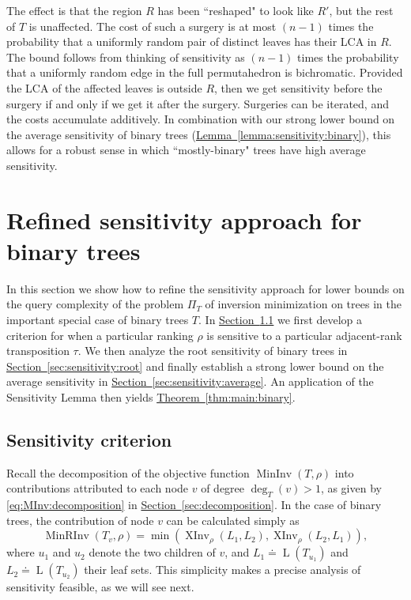 \documentclass[11pt]{article}
\numberwithin{equation}{section}
\theoremstyle{definition}
\theoremstyle{plain}
\newcommand{\expref}[2]{\hyperref[#2]{#1~\ref{#2}}}
\DeclareMathOperator{\leafset}{L}
\newcommand{\ranking}{\rho}
\newcommand{\transposition}{\tau}
\DeclareMathOperator{\XInv}{XInv}
\DeclareMathOperator{\MInv}{MinInv}
\DeclareMathOperator{\MRInv}{MinRInv}
\begin{document}
The effect is that the region $R$ has been ``reshaped" to look like $R'$, but the rest of $T$ is unaffected. The cost of such a surgery is at most $(n-1)$ times the probability that a 
uniformly random pair of distinct leaves has their LCA in $R$. The bound follows from thinking of sensitivity as $(n-1)$ times the probability that a uniformly random edge in the full permutahedron is bichromatic. Provided the LCA of 
the affected leaves is outside $R$, then we get sensitivity before the surgery if and only if we get it after the surgery. Surgeries can be iterated, and the costs accumulate additively. In combination with our strong lower bound on the average sensitivity of binary trees (\expref{Lemma}{lemma:sensitivity:binary}), this allows for a robust sense in which ``mostly-binary" trees have high average sensitivity.



\section{Refined sensitivity approach for binary trees}
\label{sec:sensitivity:binary}

In this section we show how to refine the sensitivity approach for lower bounds on the query complexity of the problem $\Pi_T$ of inversion minimization on trees in the important special case of binary trees $T$. In \expref{Section}{sec:binary:criterion} we first develop a criterion for when a particular ranking $\ranking$ is sensitive to a particular adjacent-rank transposition $\transposition$.
We then analyze the root sensitivity of binary trees in \expref{Section}{sec:sensitivity:root} and finally establish a strong lower bound on the average sensitivity in \expref{Section}{sec:sensitivity:average}. An application of the Sensitivity Lemma then yields \expref{Theorem}{thm:main:binary}.

\subsection{Sensitivity criterion}
\label{sec:binary:criterion}

Recall the decomposition of the objective function $\MInv(T,\ranking)$ into contributions attributed to each node $v$ of degree $\deg_T(v)>1$, as given by \eqref{eq:MInv:decomposition} in \expref{Section}{sec:decomposition}. In the case of binary trees, the contribution of node $v$ can be calculated simply as
\begin{equation}\label{eq:contribution:binary:retake}
\MRInv(T_v,\ranking) = \min(\XInv_\ranking(L_1,L_2),\XInv_\ranking(L_2,L_1)),
\end{equation}
where $u_1$ and $u_2$ denote the two children of $v$, and $L_1 \doteq \leafset(T_{u_1})$ and $L_2 \doteq \leafset(T_{u_2})$ their leaf sets. This simplicity makes a precise analysis of sensitivity feasible, as we will see next. 
\end{document}
